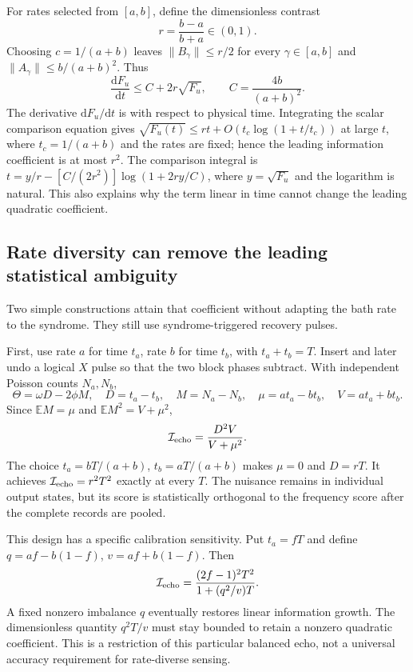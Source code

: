 \documentclass[11pt,a4paper]{article}
\numberwithin{equation}{section}
\theoremstyle{remark}
\begin{document}
For rates selected from $[a,b]$, define the dimensionless contrast
\begin{equation}
 r=\frac{b-a}{b+a}\in(0,1).
 \label{markov:r}
\end{equation}
Choosing $c=1/(a+b)$ leaves $\|B_\gamma\|\le r/2$ for every $\gamma\in[a,b]$ and
$\|A_\gamma\|\le b/(a+b)^2$. Thus
\begin{equation}
 \frac{\mathrm d F_u}{\mathrm dt}\le C+2r\sqrt{F_u},\qquad
 C=\frac{4b}{(a+b)^2}.
 \label{markov:ode}
\end{equation}
The derivative $\mathrm dF_u/\mathrm dt$ is with respect to physical time. Integrating the scalar comparison
equation gives $\sqrt{F_u(t)}\le rt+O(t_c\log(1+t/t_c))$ at large $t$,
where $t_c=1/(a+b)$ and the rates are fixed; hence the leading information
coefficient is at most $r^2$.
The comparison integral is
$t=y/r-[C/(2r^2)]\log(1+2ry/C)$, where $y=\sqrt{F_u}$ and the logarithm
is natural. This also explains why the term linear in time cannot change the
leading quadratic coefficient.

\subsection{Rate diversity can remove the leading statistical ambiguity}

Two simple constructions attain that coefficient without adapting the bath
rate to the syndrome. They still use syndrome-triggered recovery pulses.

First, use rate $a$ for time $t_a$, rate $b$ for time $t_b$, with
$t_a+t_b=T$. Insert and later undo a logical $X$ pulse so that the two block
phases subtract. With independent Poisson counts $N_a,N_b$,
\begin{equation}
 \Theta=\omega D-2\phi M,\quad
 D=t_a-t_b,\quad M=N_a-N_b,\quad
 \mu=at_a-bt_b,\quad V=at_a+bt_b.
\end{equation}
Since $\mathbb E M=\mu$ and $\mathbb E M^2=V+\mu^2$,
\begin{equation}
 \mathcal I_{\rm echo}=\frac{D^2V}{V+\mu^2}.
 \label{markov:echo}
\end{equation}
The choice $t_a=bT/(a+b)$, $t_b=aT/(a+b)$ makes $\mu=0$ and $D=rT$.
It achieves $\mathcal I_{\rm echo}=r^2T^2$ exactly at every $T$.
The nuisance remains in individual output states, but its score is statistically
orthogonal to the frequency score after the complete records are pooled.

This design has a specific calibration sensitivity. Put $t_a=fT$ and define
$q=af-b(1-f)$, $v=af+b(1-f)$. Then
\begin{equation}
 \mathcal I_{\rm echo}
 =\frac{(2f-1)^2T^2}{1+(q^2/v)T}.
 \label{markov:imbalance}
\end{equation}
A fixed nonzero imbalance $q$ eventually restores linear information growth.
The dimensionless quantity $q^2T/v$ must stay bounded to retain a nonzero
quadratic coefficient. This is a restriction of this particular balanced echo,
not a universal accuracy requirement for rate-diverse sensing.
\end{document}
